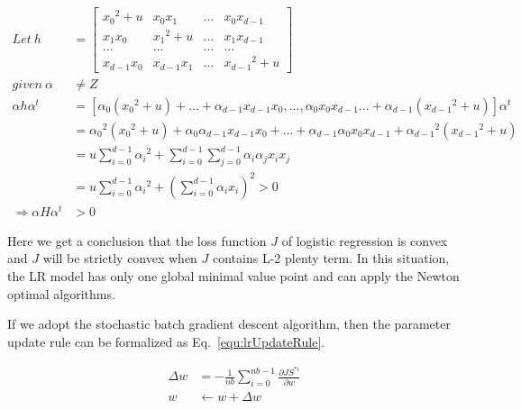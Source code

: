 \documentclass[runningheads,openany]{xhlPaper}
\begin{document}
\begin{equation}
\label{equ:lr_positive_definite_proof}
\begin{aligned}
Let\ h & = \left[ {\begin{array}{*{20}{c}}
{{x_0}^2 + u}&{{x_0}{x_1}}&{...}&{{x_0}{x_{d - 1}}}\\
{{x_1}{x_0}}&{{x_1}^2 + u}&{...}&{{x_1}{x_{d - 1}}}\\
{...}&{...}&{...}&{...}\\
{{x_{d - 1}}{x_0}}&{{x_{d - 1}}{x_1}}&{...}&{{x_{d - 1}}^2 + u}
\end{array}} \right]\\
given\ \alpha  &\ne Z\\
\alpha h{\alpha ^t} &= \left[ {{\alpha _0}\left( {{x_0}^2 + u} \right) + ... + {\alpha _{d - 1}}{x_{d - 1}}{x_0},...,{\alpha _0}{x_0}{x_{d - 1}}... + {\alpha _{d - 1}}\left( {{x_{d - 1}}^2 + u} \right)} \right]{\alpha ^t}\\
 &= {\alpha _0}^2\left( {{x_0}^2 + u} \right) + {\alpha _0}{\alpha _{d - 1}}{x_{d - 1}}{x_0} + ... + {\alpha _{d - 1}}{\alpha _0}{x_0}{x_{d - 1}} + {\alpha _{d - 1}}^2\left( {{x_{d - 1}}^2 + u} \right)\\
 &= u\sum\limits_{i = 0}^{d - 1} {{\alpha _i}^2}  + \sum\limits_{i = 0}^{d - 1} {\sum\limits_{j = 0}^{d - 1} {{\alpha _i}{\alpha _j}{x_i}{x_j}} }  \\
 &= u\sum\limits_{i = 0}^{d - 1} {{\alpha _i}^2}  + {\left( {\sum\limits_{i = 0}^{d - 1} {{\alpha _i}{x_i}} } \right)^2} > 0\\
 \Rightarrow \alpha H{\alpha ^t} &> 0
\end{aligned}
\end{equation}

Here we get a conclusion that the loss function $J$ of logistic regression is convex and $J$ will be strictly convex when $J$ contains L-2 plenty term. In this situation, the LR model has only one global minimal value point and can apply the Newton optimal algorithms.

If we adopt the stochastic batch gradient descent algorithm, then the parameter update rule can be formalized as Eq.~\ref{equ:lrUpdateRule}.

\begin{equation}
\label{equ:lrUpdateRule}
\begin{aligned}
\Delta w &=  - \frac{1}{{nb}}\sum\limits_{i = 0}^{nb - 1} {\frac{{\partial J{S^{*i}}}}{{\partial w}}} \\
w &\leftarrow w + \Delta w
\end{aligned}
\end{equation}
\end{document}
